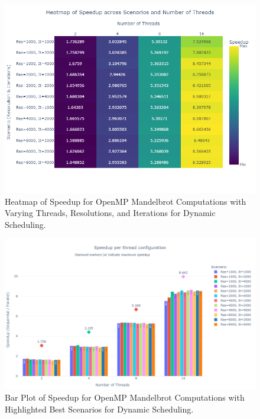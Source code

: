 \documentclass[
	report, %
	11pt, %
]{CSUniSchoolLabReport}
\begin{document}
\begin{figure}[H]
	\centering
	\captionsetup{justification=centering, width=.8\linewidth}
	\includegraphics[width=\textwidth]{./img/mandelbrot_openmp_best_speedup_vs_threads_heatmap.png}
	\caption{Heatmap of Speedup for OpenMP Mandelbrot Computations with Varying Threads, Resolutions, and Iterations for Dynamic Scheduling.}
	\label{fig:mandelbrot_openMP_best_speedup_vs_threads_heatmap}
\end{figure}

\begin{figure}[H]
	\centering
	\captionsetup{justification=centering, width=.8\linewidth}
	\includegraphics[width=\textwidth]{./img/mandelbrot_openmp_best_speedup_vs_threads_bar.png}
	\caption{Bar Plot of Speedup for OpenMP Mandelbrot Computations with Highlighted Best Scenarios for Dynamic Scheduling.}
	\label{fig:mandelbrot_openMP_best_speedup_vs_threads_bar}
\end{figure}
\end{document}
